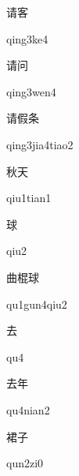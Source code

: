 \begin{multicols*}{2}
\begin{verbete}[qing3ke4]{请客}
\begin{pronuncia}{qing3ke4}
\end{pronuncia}
\end{verbete}

\begin{verbete}{请问}
\begin{pronuncia}{qing3wen4}
\end{pronuncia}
\end{verbete}

\begin{verbete}{请假条}
\begin{pronuncia}{qing3jia4tiao2}
\end{pronuncia}
\end{verbete}

\begin{verbete}{秋天}
\begin{pronuncia}{qiu1tian1}
\end{pronuncia}
\end{verbete}

\begin{verbete}[qiu2]{球}
\begin{pronuncia}{qiu2}
\end{pronuncia}
\end{verbete}

\begin{verbete}{曲棍球}
\begin{pronuncia}{qu1gun4qiu2}
\end{pronuncia}
\end{verbete}

\begin{verbete}[qu4]{去}
\begin{pronuncia}{qu4}
\end{pronuncia}
\end{verbete}

\begin{verbete}[qu4nian2]{去年}
\begin{pronuncia}{qu4nian2}
\end{pronuncia}
\end{verbete}

\begin{verbete}[qun2zi0]{裙子}
\begin{pronuncia}{qun2zi0}
\end{pronuncia}
\end{verbete}

\end{multicols*}
